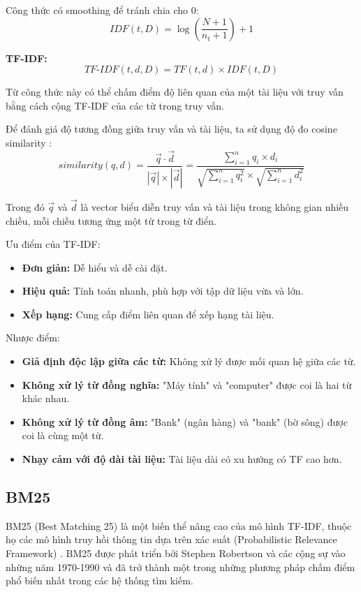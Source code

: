 \documentclass[../BTL.tex]{subfiles}
\begin{document}
Công thức có smoothing để tránh chia cho 0:
$$
IDF(t, D) = \log \left( \frac{N + 1}{n_t + 1} \right) + 1
$$

\textbf{TF-IDF:}
$$
TF\text{-}IDF(t, d, D) = TF(t, d) \times IDF(t, D)
$$

Từ công thức này có thể chấm điểm độ liên quan của một tài liệu với truy vấn bằng cách cộng TF-IDF của các từ trong truy vấn.

Để đánh giá độ tương đồng giữa truy vấn và tài liệu, ta sử dụng độ đo cosine similarity \cite{manning2008introduction}:
$$
similarity(q, d) = \frac{\vec{q} \cdot \vec{d}}{|\vec{q}| \times |\vec{d}|} = \frac{\sum_{i=1}^{n} q_i \times d_i}{\sqrt{\sum_{i=1}^{n} q_i^2} \times \sqrt{\sum_{i=1}^{n} d_i^2}}
$$

Trong đó $\vec{q}$ và $\vec{d}$ là vector biểu diễn truy vấn và tài liệu trong không gian nhiều chiều, mỗi chiều tương ứng một từ trong từ điển.

Ưu điểm của TF-IDF:
\begin{itemize}
    \item \textbf{Đơn giản:} Dễ hiểu và dễ cài đặt.
    
    \item \textbf{Hiệu quả:} Tính toán nhanh, phù hợp với tập dữ liệu vừa và lớn.
    
    \item \textbf{Xếp hạng:} Cung cấp điểm liên quan để xếp hạng tài liệu.
\end{itemize}

Nhược điểm:
\begin{itemize}
    \item \textbf{Giả định độc lập giữa các từ:} Không xử lý được mối quan hệ giữa các từ.
    
    \item \textbf{Không xử lý từ đồng nghĩa:} "Máy tính" và "computer" được coi là hai từ khác nhau.
    
    \item \textbf{Không xử lý từ đồng âm:} "Bank" (ngân hàng) và "bank" (bờ sông) được coi là cùng một từ.
    
    \item \textbf{Nhạy cảm với độ dài tài liệu:} Tài liệu dài có xu hướng có TF cao hơn.
\end{itemize}

\subsection{BM25}
BM25 (Best Matching 25) là một biến thể nâng cao của mô hình TF-IDF, thuộc họ các mô hình truy hồi thông tin dựa trên xác suất (Probabilistic Relevance Framework) \cite{BM25}. BM25 được phát triển bởi Stephen Robertson và các cộng sự vào những năm 1970-1990 và đã trở thành một trong những phương pháp chấm điểm phổ biến nhất trong các hệ thống tìm kiếm.
\end{document}
